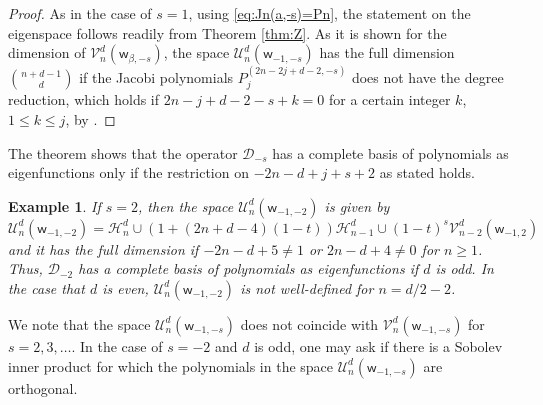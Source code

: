 \documentclass{amsart}
\newtheorem{exam}[thm]{Example}
\theoremstyle{remark}
\def\sw{{\mathsf w}}
\def\b{{\beta}}
\def\CD{{\mathcal D}}
\def\CH{{\mathcal H}}
\def\CU{{\mathcal U}}
\def\CV{{\mathcal V}}
\begin{document}
\begin{proof}
As in the case of $s = 1$, using \eqref{eq:Jn(a,-s)=Pn}, the statement on the eigenspace follows readily
from Theorem \ref{thm:Z}. As it is shown for the dimension of $\CV_n^d(\sw_{\b,-s})$, the space
$\CU_n^d(\sw_{-1,-s})$ has the full dimension $\binom{n+d-1}{d}$ if the Jacobi polynomials
$P_j^{(2n-2j+d-2,-s)}$ does not have the degree reduction, which holds if $2n-j+d-2-s +k =0$ for a
certain integer $k$, $1 \le k \le j$, by \cite[p. 64]{Sz}.
\end{proof}

The theorem shows that the operator $\CD_{-s}$ has a complete basis of polynomials as eigenfunctions
only if the restriction on $-2n-d+j+s+2$ as stated holds.

\begin{exam}
If $s = 2$, then the space $\CU_n^d(\sw_{-1,-2})$ is given by
$$
  \CU_n^d(\sw_{-1,-2}) = \CH_n^d \cup  \left(1+ (2n+d-4)(1-t) \right) \CH_{n-1}^d
   \cup (1-t)^s \CV_{n-2}^d (\sw_{-1,2})
$$
and it has the full dimension if $-2n-d+5 \ne 1$ or $2n-d+4 \ne 0$ for $n \ge 1$. Thus, $\CD_{-2}$ has a complete
basis of polynomials as eigenfunctions if $d$ is odd. In the case that $d$ is even, $ \CU_n^d(\sw_{-1,-2})$ is
not well-defined for $n = d/2-2$.
\end{exam}

We note that the space $\CU_n^d(\sw_{-1,-s})$ does not coincide with $\CV_n^d(\sw_{-1,-s})$ for $s =2,3,\ldots$.
In the case of $s = -2$ and $d$ is odd, one may ask if there is a Sobolev inner product for which the polynomials
in the space $\CU_n^d(\sw_{-1,-s})$ are orthogonal.
\end{document}
